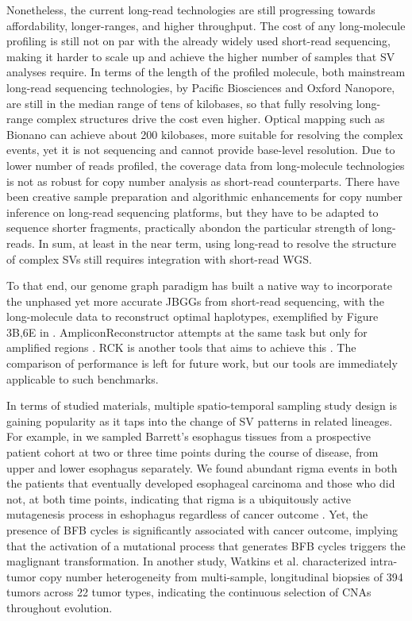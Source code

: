 \documentclass[phd,tocprelim]{cornell}
\begin{document}
Nonetheless, the current long-read technologies are still progressing towards affordability, longer-ranges, and higher throughput. The cost of any long-molecule profiling is still not on par with the already widely used short-read sequencing, making it harder to scale up and achieve the higher number of samples that SV analyses require. In terms of the length of the profiled molecule, both mainstream long-read sequencing technologies, by Pacific Biosciences and Oxford Nanopore, are still in the median range of tens of kilobases, so that fully resolving long-range complex structures drive the cost even higher. Optical mapping such as Bionano can achieve about 200 kilobases, more suitable for resolving the complex events, yet it is not sequencing and cannot provide base-level resolution. Due to lower number of reads profiled, the coverage data from long-molecule technologies is not as robust for copy number analysis as short-read counterparts. There have been creative sample preparation and algorithmic enhancements \cite{Baslan2020-hz,Prabakar2019-dw} for copy number inference on long-read sequencing platforms, but they have to be adapted to sequence shorter fragments, practically abondon the particular strength of long-reads. In sum, at least in the near term, using long-read to resolve the structure of complex SVs still requires integration with short-read WGS.

To that end, our genome graph paradigm has built a native way to incorporate the unphased yet more accurate JBGGs from short-read sequencing, with the long-molecule data to reconstruct optimal haplotypes, exemplified by Figure 3B,6E in \cite{Hadi2020-um}. AmpliconReconstructor attempts at the same task but only for amplified regions \cite{Luebeck2020-ow}. RCK is another tools that aims to achieve this \cite{Aganezov2020-cu}. The comparison of performance is left for future work, but our tools are immediately applicable to such benchmarks.

In terms of studied materials, multiple spatio-temporal sampling study design is gaining popularity as it taps into the change of SV patterns in related lineages. For example, in \cite{Paulson2021-nd} we sampled Barrett's esophagus tissues from a prospective patient cohort at two or three time points during the course of disease, from upper and lower esophagus separately. We found abundant rigma events in both the patients that eventually developed esophageal carcinoma and those who did not, at both time points, indicating that rigma is a ubiquitously active mutagenesis process in eshophagus regardless of cancer outcome \cite{Hadi2020-um}. Yet, the presence of BFB cycles is significantly associated with cancer outcome, implying that the activation of a mutational process that generates BFB cycles triggers the maglignant transformation. In another study, Watkins et al. characterized intra-tumor copy number heterogeneity from multi-sample, longitudinal biopsies of 394 tumors across 22 tumor types, indicating the continuous selection of CNAs throughout evolution.
\end{document}
